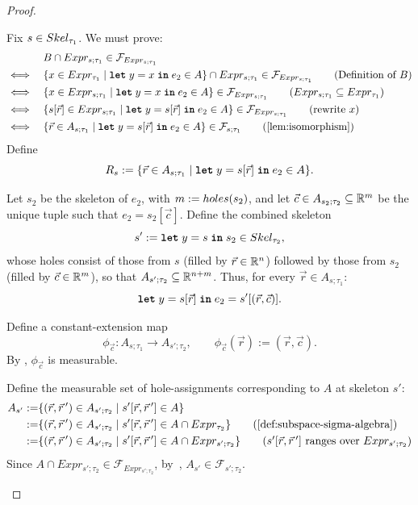 \begin{proof}
\begin{itemize}
		Fix $s \in Skel_{\tau_1}$. We must prove:
		\begin{align*}
			&B \cap Expr_{s;\tau_1} \in \mathcal{F}_{Expr_{s;\tau_1}} \\
			\iff \quad&\{x \in Expr_{\tau_1} \mid \letkw\; y = x\; \inkw\; e_2 \in A\} \cap Expr_{s;\tau_1} \in \mathcal{F}_{Expr_{s;\tau_1}} \tag{Definition of $B$}\\
			\iff \quad&\{x \in Expr_{s;\tau_1} \mid \letkw\; y = x\; \inkw\; e_2 \in A\} \in \mathcal{F}_{Expr_{s;\tau_1}} \tag{$Expr_{s;\tau_1} \subseteq Expr_{\tau_1}$}\\
			\iff \quad&\{s[\vec{r}] \in Expr_{s;\tau_1} \mid \letkw\; y = s[\vec{r}]\; \inkw\; e_2 \in A\} \in \mathcal{F}_{Expr_{s;\tau_1}} \tag{rewrite $x$}\\
			\iff \quad&\{\vec{r} \in A_{s;\tau_1} \mid \letkw\; y = s[\vec{r}]\; \inkw\; e_2 \in A\} \in \mathcal{F}_{s;\tau_1} \tag{\Cref{lem:isomorphism}}
		\end{align*}
		Define
		\[
			R_s := \{\vec{r} \in A_{s;\tau_1} \mid \textnormal{\ttfamily\bfseries let}\; y = s[\vec{r}]\; \textnormal{\ttfamily\bfseries in}\; e_2 \in A\}.
		\]
		
		\medskip

		Let $s_2$ be the skeleton of $e_2$, with $m := holes(s_2)$, and let $\vec{c} \in A_{s_2;\tau_2} \subseteq \mathbb{R}^m$ be the unique tuple such that $e_2 = s_2[\vec{c}]$. Define the combined skeleton
		\[
			s' := \textnormal{\ttfamily\bfseries let}\; y = s\; \textnormal{\ttfamily\bfseries in}\; s_2 \in Skel_{\tau_2},
		\]
		whose holes consist of those from $s$ (filled by $\vec{r} \in \mathbb{R}^n$) followed by those from $s_2$ (filled by $\vec{c} \in \mathbb{R}^m$), so that $A_{s';\tau_2} \subseteq \mathbb{R}^{n+m}$. Thus, for every $\vec{r} \in A_{s;\tau_1}$:
		\[
			\textnormal{\ttfamily\bfseries let}\; y = s[\vec{r}]\; \textnormal{\ttfamily\bfseries in}\; e_2 = s'[(\vec{r}, \vec{c})].
		\]
	
		\medskip
		Define a constant-extension map
		\[
			\phi_{\vec{c}} \colon A_{s;\tau_1} \to A_{s';\tau_2},
			\qquad
			\phi_{\vec{c}}(\vec{r}) := (\vec{r}, \vec{c}).
		\]
			By , $\phi_{\vec{c}}$ is measurable.

		Define the measurable set of hole-assignments corresponding to $A$ at skeleton $s'$:
		\begin{align*}
			A_{s'} := &\{(\vec{r}, \vec{r}\,') \in A_{s';\tau_2} \mid s'[\vec{r}, \vec{r}\,'] \in A\} \\
			:= &\{(\vec{r}, \vec{r}\,') \in A_{s';\tau_2} \mid s'[\vec{r}, \vec{r}\,'] \in A \cap Expr_{\tau_2}\} \tag{\Cref{def:subspace-sigma-algebra}}\\
			:= &\{(\vec{r}, \vec{r}\,') \in A_{s';\tau_2} \mid s'[\vec{r}, \vec{r}\,'] \in A \cap Expr_{s';\tau_2}\} \tag{$s'[\vec{r}, \vec{r}\,']$ ranges over $Expr_{s';\tau_2}$}
		\end{align*}
		Since $A \cap Expr_{s';\tau_2} \in \mathcal{F}_{Expr_{s';\tau_2}}$, by~, $A_{s'} \in \mathcal{F}_{s';\tau_2}$.
	

\end{itemize}
\end{proof}
